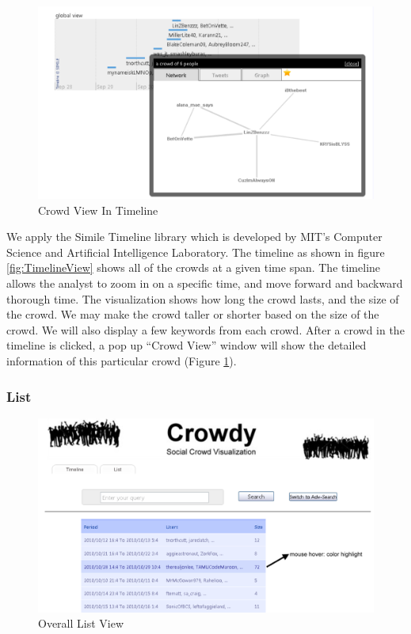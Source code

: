 \documentclass{sig-alternate}
\begin{document}
\begin{figure}
\centering
\includegraphics[width=\linewidth]{imgs/CrowdViewInTimeLine.png}
\caption{Crowd View In Timeline}
\label{fig:CrowdViewInTimeline}
\end{figure}

We apply the Simile Timeline library which is developed by MIT's Computer
Science and Artificial Intelligence Laboratory. The timeline as shown in figure \ref{fig:TimelineView} shows all of the
crowds at a given time span.  The timeline allows the analyst to zoom in on a
specific time, and move forward and backward thorough time.  The visualization
shows how long the crowd lasts, and the size of the crowd. We may make the
crowd taller or shorter based on the size of the crowd.  We will also display a
few keywords from each crowd. After a crowd in the timeline is clicked, a pop up ``Crowd View'' window will show the detailed information of this particular crowd (Figure \ref{fig:CrowdViewInTimeline}).

\subsubsection{List}

\begin{figure}
\centering
\includegraphics[width=\linewidth]{imgs/ListView.png}
\caption{Overall List View}
\label{fig:ListView}
\end{figure}
\end{document}
